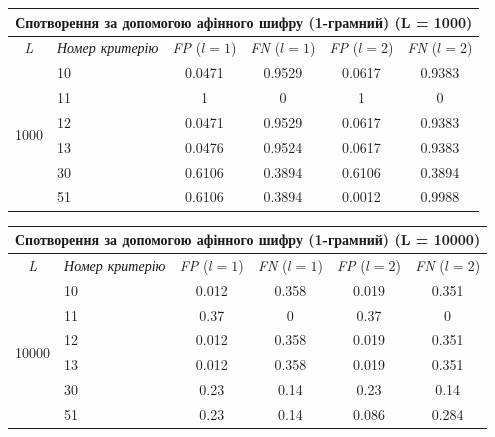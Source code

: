 \documentclass[a4paper,12pt]{article}
\begin{document}
\begin{center}
\renewcommand{\arraystretch}{1.2}
\setlength{\tabcolsep}{6pt}
\begin{tabular}{|c|l||c|c||c|c|}
\hline
\multicolumn{6}{|c|}{Спотворення за допомогою афінного шифру (1-грамний) (L = 1000)} \\
\hline
\textit{L} & \textit{Номер критерію} & \textit{FP} ($l=1$) & \textit{FN} ($l=1$) & \textit{FP} ($l=2$) & \textit{FN} ($l=2$) \\
\hline
\multirow{6}{*}{1000} & 10 & 0.0471 & 0.9529 & 0.0617 & 0.9383 \\
 & 11 & 1 & 0 & 1 & 0 \\
 & 12 & 0.0471 & 0.9529 & 0.0617 & 0.9383 \\
 & 13 & 0.0476 & 0.9524 & 0.0617 & 0.9383 \\
 & 30 & 0.6106 & 0.3894 & 0.6106 & 0.3894 \\
 & 51 & 0.6106 & 0.3894 & 0.0012 & 0.9988 \\
\hline
\end{tabular}
\end{center}

\begin{center}
\renewcommand{\arraystretch}{1.2}
\setlength{\tabcolsep}{6pt}
\begin{tabular}{|c|l||c|c||c|c|}
\hline
\multicolumn{6}{|c|}{Спотворення за допомогою афінного шифру (1-грамний) (L = 10000)} \\
\hline
\textit{L} & \textit{Номер критерію} & \textit{FP} ($l=1$) & \textit{FN} ($l=1$) & \textit{FP} ($l=2$) & \textit{FN} ($l=2$) \\
\hline
\multirow{6}{*}{10000} & 10 & 0.012 & 0.358 & 0.019 & 0.351 \\
 & 11 & 0.37 & 0 & 0.37 & 0 \\
 & 12 & 0.012 & 0.358 & 0.019 & 0.351 \\
 & 13 & 0.012 & 0.358 & 0.019 & 0.351 \\
 & 30 & 0.23 & 0.14 & 0.23 & 0.14 \\
 & 51 & 0.23 & 0.14 & 0.086 & 0.284 \\
\hline
\end{tabular}
\end{center}
\end{document}
